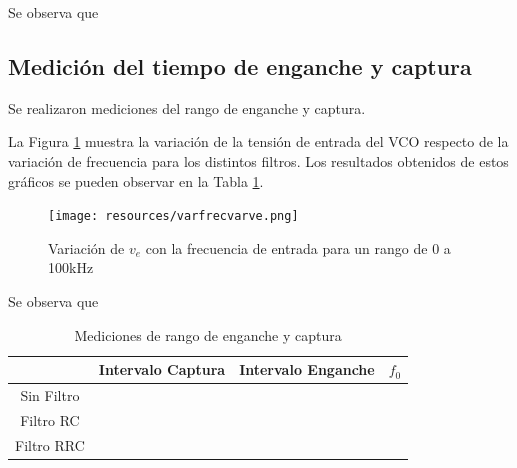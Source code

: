 \documentclass{article}
\begin{document}
Se observa que


\subsection{Medición del tiempo de enganche y captura}
Se realizaron mediciones del rango de enganche y captura. 

La Figura \ref{varfrecvarve} muestra la variación de la tensión de entrada del VCO respecto de la variación de frecuencia para los distintos filtros. Los resultados obtenidos de estos gráficos se pueden observar en la Tabla \ref{tablacaptura}.

\begin{figure}[H]
    \centering
    \texttt{[image: resources/varfrecvarve.png]}
    \caption{Variación de $v_{e}$ con la frecuencia de entrada para un rango de 0 a 100kHz}
    \label{varfrecvarve}
\end{figure}

Se observa que %

\begin{table}[H]
    \centering
    \begin{tabular}{|c|c|c|c|}
    \hline
                &Intervalo Captura  &   Intervalo Enganche  & $f_{0}$   \tabularnewline
    \hline
    \hline
    Sin Filtro &                   &                       &           \tabularnewline
    \hline
    Filtro RC  &                   &                       &           \tabularnewline 
    \hline
    Filtro RRC &                   &                       &           \tabularnewline
    \hline
    \end{tabular}
    \caption{Mediciones de rango de enganche y captura}
    \label{tablacaptura}
\end{table}
\end{document}
